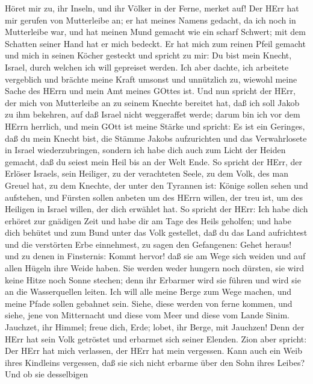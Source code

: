  Höret mir zu, ihr Inseln, und ihr Völker in der Ferne,
merket auf! Der HErr hat mir gerufen von Mutterleibe an; er hat meines
Namens gedacht, da ich noch in Mutterleibe war,  und hat
meinen Mund gemacht wie ein scharf Schwert; mit dem Schatten seiner Hand
hat er mich bedeckt. Er hat mich zum reinen Pfeil gemacht und mich in
seinen Köcher gesteckt  und spricht zu mir: Du bist mein
Knecht, Israel, durch welchen ich will gepreiset werden. 
Ich aber dachte, ich arbeitete vergeblich und brächte meine Kraft
umsonst und unnützlich zu, wiewohl meine Sache des HErrn und mein Amt
meines GOttes ist.  Und nun spricht der HErr, der mich von
Mutterleibe an zu seinem Knechte bereitet hat, daß ich soll Jakob zu ihm
bekehren, auf daß Israel nicht weggeraffet werde; darum bin ich vor dem
HErrn herrlich, und mein GOtt ist meine Stärke  und spricht:
Es ist ein Geringes, daß du mein Knecht bist, die Stämme Jakobs
aufzurichten und das Verwahrlosete in Israel wiederzubringen, sondern
ich habe dich auch zum Licht der Heiden gemacht, daß du seiest mein Heil
bis an der Welt Ende.  So spricht der HErr, der Erlöser
Israels, sein Heiliger, zu der verachteten Seele, zu dem Volk, des man
Greuel hat, zu dem Knechte, der unter den Tyrannen ist: Könige sollen
sehen und aufstehen, und Fürsten sollen anbeten um des HErrn willen, der
treu ist, um des Heiligen in Israel willen, der dich erwählet hat.
 So spricht der HErr: Ich habe dich erhöret zur gnädigen
Zeit und habe dir am Tage des Heils geholfen; und habe dich behütet und
zum Bund unter das Volk gestellet, daß du das Land aufrichtest und die
verstörten Erbe einnehmest,  zu sagen den Gefangenen: Gehet
heraus! und zu denen in Finsternis: Kommt hervor! daß sie am Wege sich
weiden und auf allen Hügeln ihre Weide haben.  Sie werden
weder hungern noch dürsten, sie wird keine Hitze noch Sonne stechen;
denn ihr Erbarmer wird sie führen und wird sie an die Wasserquellen
leiten.  Ich will alle meine Berge zum Wege machen, und
meine Pfade sollen gebahnet sein.  Siehe, diese werden von
ferne kommen, und siehe, jene von Mitternacht und diese vom Meer und
diese vom Lande Sinim.  Jauchzet, ihr Himmel; freue dich,
Erde; lobet, ihr Berge, mit Jauchzen! Denn der HErr hat sein Volk
getröstet und erbarmet sich seiner Elenden.  Zion aber
spricht: Der HErr hat mich verlassen, der HErr hat mein vergessen.
 Kann auch ein Weib ihres Kindleins vergessen, daß sie sich
nicht erbarme über den Sohn ihres Leibes? Und ob sie desselbigen
